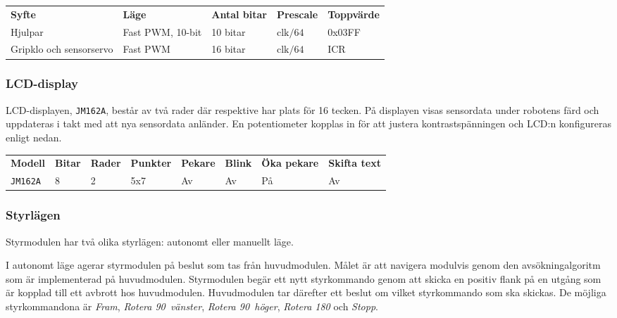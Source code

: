 \documentclass[11pt]{article}
\begin{document}
\begin{flushleft}
\begin{center}
\begin{tabular}{l l l l l}

    \textbf{Syfte} & \textbf{Läge} & \textbf{Antal bitar} & \textbf{Prescale} & \textbf{Toppvärde} \\
    Hjulpar & Fast PWM, 10-bit & 10 bitar & $\text{clk}/64$ &  0x03FF \\
	Gripklo och sensorservo & Fast PWM & 16 bitar & $\text{clk}/64$  & ICR \\
\end{tabular}
\end{center}

\subsubsection{LCD-display}
LCD-displayen, \verb+JM162A+, består av två rader där respektive har plats för 16 tecken. På displayen visas sensordata under robotens färd och uppdateras i takt med att nya sensordata anländer. En potentiometer kopplas in för att justera kontrastspänningen och LCD:n konfigureras enligt nedan.

\begin{center}
  \begin{tabular}{l l l l l l l l}
      \textbf{Modell} & \textbf{Bitar} & \textbf{Rader} & \textbf{Punkter} & \textbf{Pekare} & \textbf{Blink} & \textbf{Öka pekare} & \textbf{Skifta text} \\
      \verb+JM162A+ & 8 & 2 & 5x7 & Av & Av & På & Av \\
    \end{tabular}
  \end{center}

\subsubsection{Styrlägen}
Styrmodulen har två olika styrlägen: autonomt eller manuellt läge.
\begin{description}[style=unboxed, leftmargin=0cm]
  \item[Autonomt läge]
I autonomt läge agerar styrmodulen på beslut som tas från huvudmodulen. Målet är att navigera modulvis genom den avsökningalgoritm som är implementerad på huvudmodulen. Styrmodulen begär ett nytt styrkommando genom att skicka en positiv flank på en utgång som är kopplad till ett avbrott hos huvudmodulen. Huvudmodulen tar därefter ett beslut om vilket styrkommando som ska skickas. De möjliga styrkommandona är \textit{Fram}, \textit{Rotera 90\textdegree\ vänster}, \textit{Rotera 90\textdegree\ höger}, \textit{Rotera 180\textdegree} och \textit{Stopp}. 


\end{description}
\end{flushleft}
\end{document}
